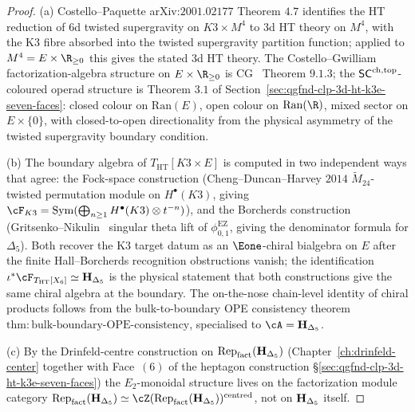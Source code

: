 \begin{proof}
(a) Costello--Paquette arXiv:$2001.02177$ Theorem $4.7$ identifies the
HT reduction of $6$d twisted supergravity on $K3\times M^4$ to $3$d HT
theory on $M^4$, with the K3 fibre absorbed into the twisted
supergravity partition function; applied to $M^4=E\times\R_{\geq 0}$
this gives the stated $3$d HT theory. The Costello--Gwilliam
factorization-algebra structure on $E\times\R_{\geq 0}$ is
CG~\cite{CG21} Theorem $9.1.3$; the $\mathsf{SC}^{\mathrm{ch,top}}$-coloured operad
structure is Theorem $3$.$1$ of
Section~\ref{sec:qgfnd-clp-3d-ht-k3e-seven-faces}: closed colour on $\mathrm{Ran}(E)$,
open colour on $\mathrm{Ran}(\R)$, mixed sector on $E\times\{0\}$,
with closed-to-open directionality from the physical asymmetry of
the twisted supergravity boundary condition.

(b) The boundary algebra of $T_{\mathrm{HT}}[K3\times E]$ is
computed in two independent ways that agree: the Fock-space
construction (Cheng--Duncan--Harvey $2014$ $\widetilde{M}_{24}$-twisted
permutation module on $H^\bullet(K3)$, giving
$\cF_{K3}=\mathrm{Sym}(\bigoplus_{n\geq 1}H^\bullet(K3)\otimes t^{-n})$),
and the Borcherds construction
(Gritsenko--Nikulin~\cite{GN1998} singular theta
lift of \(\phi_{0,1}^{\mathrm{EZ}}\), giving the denominator formula
for \(\Delta_5\)).
Both recover the K3 target datum as an $\Eone$-chiral bialgebra on
$E$ after the finite Hall--Borcherds recognition obstructions vanish; the
identification $\iota^*\cF_{T_{\mathrm{HT}}[X_6]}\simeq\HDelta$ is the
physical statement that both constructions give the same chiral
algebra at the boundary. The on-the-nose chain-level identity of
chiral products follows from the bulk-to-boundary OPE consistency
theorem
$\mathrm{thm:bulk\text{-}boundary\text{-}OPE\text{-}consistency}$,
specialised to $\cA=\HDelta$.

(c) By the Drinfeld-centre construction on
$\mathrm{Rep}_{\mathrm{fact}}(\mathbf{H}_{\Delta_5})$ (Chapter~\ref{ch:drinfeld-center}
together with Face~$(6)$ of the heptagon construction
\S\ref{sec:qgfnd-clp-3d-ht-k3e-seven-faces}) the $E_2$-monoidal
structure lives on the factorization module category
$\mathrm{Rep}_{\mathrm{fact}}(\HDelta)\simeq
\cZ(\mathrm{Rep}_{\mathrm{fact}}(\HDelta))^{\mathrm{centred}}$,
not on $\mathbf{H}_{\Delta_5}$ itself.


\end{proof}
